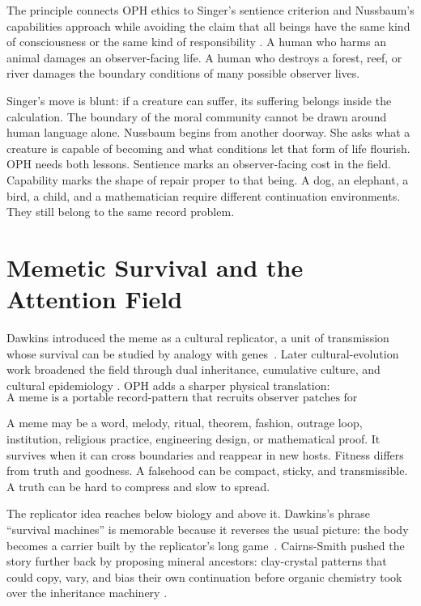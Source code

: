 \documentclass[11pt]{article}
\theoremstyle{remark}
\theoremstyle{plain}
\begin{document}
The principle connects OPH ethics to Singer's sentience criterion and
Nussbaum's capabilities approach while avoiding the claim that all beings have
the same kind of consciousness or the same kind of responsibility
\cite{Singer1975,Nussbaum2006,Nussbaum2023}. A human who harms an animal
damages an observer-facing life. A human who destroys a forest, reef, or river
damages the boundary conditions of many possible observer lives.

Singer's move is blunt: if a creature can suffer, its suffering belongs inside
the calculation. The boundary of the moral community cannot be drawn around
human language alone. Nussbaum begins from another doorway. She asks what a
creature is capable of becoming and what conditions let that form of life
flourish. OPH needs both lessons. Sentience marks an observer-facing cost in
the field. Capability marks the shape of repair proper to that being. A dog, an
elephant, a bird, a child, and a mathematician require different continuation
environments. They still belong to the same record problem.

\section{Memetic Survival and the Attention Field}

Dawkins introduced the meme as a cultural replicator, a unit of transmission
whose survival can be studied by analogy with genes~\cite{Dawkins1976}. Later
cultural-evolution work broadened the field through dual inheritance,
cumulative culture, and cultural epidemiology
\cite{SEPCulturalEvolution,BoydRicherson1985,Henrich2015,Sperber1996}. OPH
adds a sharper physical translation:
\[
\boxed{
\text{A meme is a portable record-pattern that recruits observer patches for replication.}
}
\]

A meme may be a word, melody, ritual, theorem, fashion, outrage loop,
institution, religious practice, engineering design, or mathematical proof. It
survives when it can cross boundaries and reappear in new hosts. Fitness differs
from truth and goodness. A falsehood can be compact, sticky, and transmissible.
A truth can be hard to compress and slow to spread.

The replicator idea reaches below biology and above it. Dawkins's phrase
``survival machines'' is memorable because it reverses the usual picture: the
body becomes a carrier built by the replicator's long game~\cite{Dawkins1976}.
Cairns-Smith pushed the story further back by proposing mineral ancestors:
clay-crystal patterns that could copy, vary, and bias their own continuation
before organic chemistry took over the inheritance machinery
\cite{CairnsSmith1982}.
\end{document}
